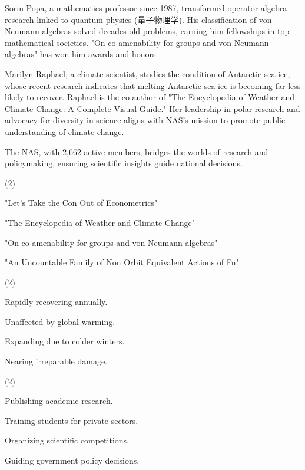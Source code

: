 \documentclass{英语试卷}
\begin{document}
\par Sorin Popa, a mathematics professor since 1987, transformed operator algebra research linked to quantum physics (量子物理学). His classification of von Neumann algebras solved decades-old problems, earning him fellowships in top mathematical societies. "On co-amenability for groups and von Neumann algebras" has won him awards and honors.\par
\par Marilyn Raphael, a climate scientist, studies the condition of Antarctic sea ice, whose recent research indicates that melting Antarctic sea ice is becoming far less likely to recover. Raphael is the co-author of "The Encyclopedia of Weather and Climate Change: A Complete Visual Guide." Her leadership in polar research and advocacy for diversity in science aligns with NAS's mission to promote public understanding of climate change.\par
\par The NAS, with 2,662 active members, bridges the worlds of research and policymaking, ensuring scientific insights guide national decisions.\par
{}
\begin{choices}(2)
  \item "Let's Take the Con Out of Econometrics"
  \item "The Encyclopedia of Weather and Climate Change"
  \item "On co-amenability for groups and von Neumann algebras"
  \item "An Uncountable Family of Non Orbit Equivalent Actions of Fn"
\end{choices}
\begin{choices}(2)
  \item Rapidly recovering annually.
  \item Unaffected by global warming.
  \item Expanding due to colder winters.
  \item Nearing irreparable damage.
\end{choices}
\begin{choices}(2)
  \item Publishing academic research.
  \item Training students for private sectors.
  \item Organizing scientific competitions.
  \item Guiding government policy decisions.
\end{choices}
\end{document}
